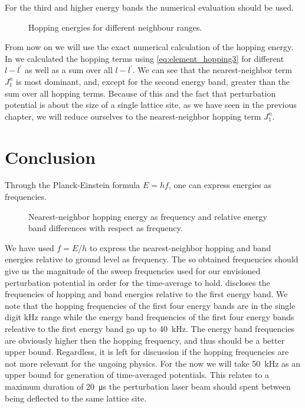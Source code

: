 For the third and higher energy bands the numerical evaluation should be used.
\begin{figure}[htb]
  \centering
  \begin{adjustbox}{width=\textwidth}
    
  \end{adjustbox}
  \caption{Hopping energies for different neighbour ranges.
  }\label{fig:scale_hopping}
\end{figure}
From now on we will use the exact numerical calculation of the hopping energy.
In  we calculated the hopping terms using
\cref{eq:element_hopping3} for different $l-l^\prime$ as well as a sum over
all $l-l^\prime$. We can see that the nearest-neighbor term $J^n_1$ is most
dominant, and, except for the second energy band, greater than the sum over
all hopping terms. Because of this and the fact that perturbation potential
is about the size of a single lattice site, as we have seen in the previous
chapter, we will reduce ourselves to the nearest-neighbor hopping term
$J^n_1$.

\section{Conclusion}

Through the Planck-Einstein formula $E=hf$, one can express energies as
frequencies.
\begin{figure}[htb]
  \centering
  \begin{adjustbox}{width=\textwidth}
    
  \end{adjustbox}
  \caption{Nearest-neighbor hopping energy as frequency and relative energy
    band differences with respect as frequency.
  }\label{fig:scale_frequency}
\end{figure}
We have used $f=E/h$ to express the nearest-neighbor hopping and band
energies relative to ground level as frequency. The so obtained
frequencies should give us the magnitude of the sweep frequencies used for our
envisioned perturbation potential in order for the time-average to hold.
 discloses the frequencies of hopping and band
energies relative to the first energy band. We note that the hopping
frequencies of the first four energy bands are in the single digit
\si{\kilo\hertz} range while the energy band frequencies of the first four
energy bands releative to the first energy band go up to \SI{40}{\kilo\hertz}.
The energy band frequencies are obviously higher then the hopping frequency,
and thus should be a better upper bound. Regardless, it is left for discussion
if the hopping frequencies are not more relevant for the ungoing physics. For
the now we will take \SI{50}{\kilo\hertz} as an upper bound for generation
of time-averaged potentials. This relates to a maximum duration of
\SI{20}{\micro\second} the perturbation laser beam should spent between
being deflected to the same lattice site.

